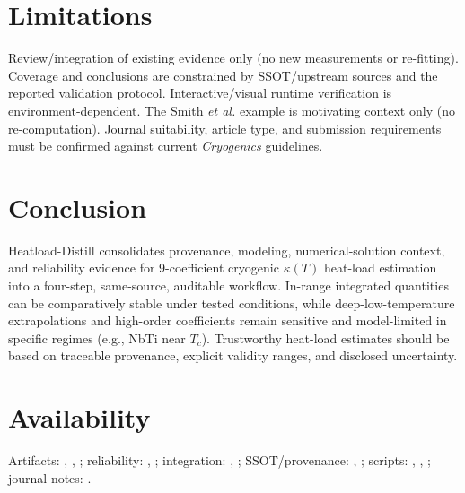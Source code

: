 \documentclass[11pt,a4paper]{article}
\begin{document}
\section{Limitations}
Review/integration of existing evidence only (no new measurements or re-fitting). Coverage and conclusions are constrained by SSOT/upstream sources and the reported validation protocol. Interactive/visual runtime verification is environment-dependent. The Smith \textit{et al.} example is motivating context only (no re-computation). Journal suitability, article type, and submission requirements must be confirmed against current \textit{Cryogenics} guidelines.

\section{Conclusion}
Heatload-Distill consolidates provenance, modeling, numerical-solution context, and reliability evidence for 9-coefficient cryogenic $\kappa(T)$ heat-load estimation into a four-step, same-source, auditable workflow. In-range integrated quantities can be comparatively stable under tested conditions, while deep-low-temperature extrapolations and high-order coefficients remain sensitive and model-limited in specific regimes (e.g., NbTi near $T_c$). Trustworthy heat-load estimates should be based on traceable provenance, explicit validity ranges, and disclosed uncertainty.

\section*{Availability}
Artifacts: , , ; reliability: , ; integration: , ; SSOT/provenance: , ; scripts: , , ; journal notes: .
\end{document}
